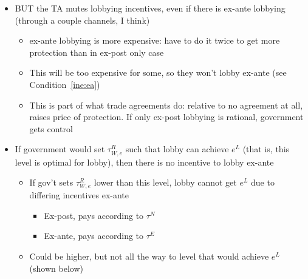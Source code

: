 \documentclass[12pt]{article}
\begin{document}
\newpage
\begin{itemize}					
	\item BUT the TA mutes lobbying incentives, even if there is ex-ante lobbying (through a couple channels, I think)
		\begin{itemize}
			\item ex-ante lobbying is more expensive: have to do it twice to get more protection than in ex-post only case

									\item This will be too expensive for some, so they won't lobby ex-ante (see Condition~\ref{ine:ea})
									\item This is part of what trade agreements do: relative to no agreement at all, raises price of protection. If only ex-post lobbying is rational, government gets control

		\end{itemize}
				
			\item If government would set $\tau^R_{W,e}$ such that lobby can achieve $e^L$ (that is, this level is optimal for lobby), then there is no incentive to lobby ex-ante
				\begin{itemize}
					\item If gov't sets $\tau^R_{W,e}$ lower than this level, lobby cannot get $e^L$ due to differing incentives ex-ante 
						\begin{itemize}
							\item Ex-post, pays according to $\tau^N$
							\item Ex-ante, pays according to $\tau^E$
						\end{itemize}
					\item Could be higher, but not all the way to level that would achieve $e^L$ (shown below)
				\end{itemize}
		

\end{itemize}
\end{document}
